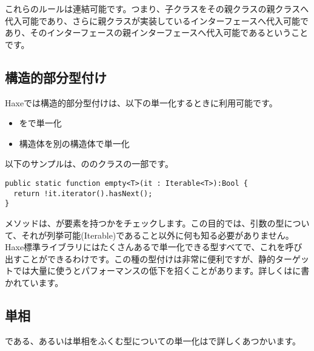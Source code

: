 これらのルールは連結可能です。つまり、子クラスをその親クラスの親クラスへ代入可能であり、さらに親クラスが実装しているインターフェースへ代入可能であり、そのインターフェースの親インターフェースへ代入可能であるということです。


\subsection{構造的部分型付け}
\label{type-system-structural-subtyping}


Haxeでは構造的部分型付けは、以下の単一化するときに利用可能です。

\begin{itemize}
	\item {}をで単一化
	\item 構造体を別の構造体で単一化
\end{itemize}

以下のサンプルは、ののクラスの一部です。

\begin{lstlisting}
public static function empty<T>(it : Iterable<T>):Bool {
  return !it.iterator().hasNext();
}
\end{lstlisting}

メソッドは、が要素を持つかをチェックします。この目的では、引数の型について、それが列挙可能(Iterable)であること以外に何も知る必要がありません。Haxe標準ライブラリにはたくさんあるで単一化できる型すべてで、これを呼び出すことができるわけです。この種の型付けは非常に便利ですが、静的ターゲットでは大量に使うとパフォーマンスの低下を招くことがあります。詳しくはに書かれています。


\subsection{単相}
\label{type-system-monomorphs}

である、あるいは単相をふくむ型についての単一化はで詳しくあつかいます。

